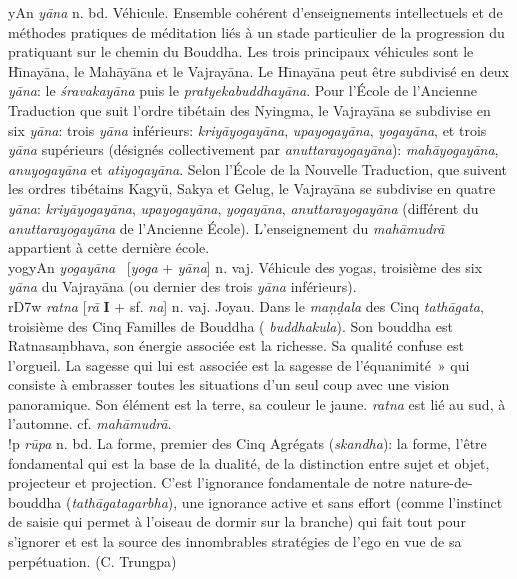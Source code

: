 \documentclass[a4paper,11pt,twocolumn]{article}
\begin{document}
{\dn yAn} {\em y\={a}na} n. bd. \og Véhicule\fg. Ensemble cohérent
d'enseignements intellectuels et de méthodes pratiques de méditation
liés à un stade particulier de la progression du pratiquant sur le
chemin du Bouddha. Les trois principaux véhicules sont le
H\={\i}nay\={a}na, le Mah\={a}y\={a}na et le
Vajray\={a}na. Le H\={\i}nay\={a}na peut être subdivisé en deux
{\em y\={a}na}: le {\em \'{s}ravakay\={a}na} puis le
{\em pratyekabuddhay\={a}na}. Pour l'École de l'Ancienne
Traduction que suit l'ordre tibétain des Nyingma, le
Vajray\={a}na se subdivise en six {\em y\={a}na}: trois {\em
y\={a}na} inférieurs: {\em kriy\={a}yogay\={a}na}, {\em
upayogay\={a}na},  {\em yogay\={a}na}, et trois {\em
y\={a}na} supérieurs (désignés collectivement par {\em
anuttarayogay\={a}na}): {\em mah\={a}yogay\={a}na}, {\em
anuyogay\={a}na} et {\em atiyogay\={a}na}. Selon l'École de
la Nouvelle Traduction, que suivent les ordres tibétains Kagyü,
Sakya et Gelug, le Vajray\={a}na se subdivise en quatre {\em
y\={a}na}: {\em kriy\={a}yogay\={a}na}, {\em upayogay\={a}na}, {\em
yogay\={a}na},  {\em anuttarayogay\={a}na} (différent du {\em
anuttarayogay\={a}na} de l'Ancienne École). L'enseignement du {\em
mah\={a}mudr\={a}} appartient à cette dernière école. \\


{\dn yogyAn} {\em yogay\={a}na} \ [{\em yoga} + {\em y\={a}na}]
n. vaj. \og Véhicule des yogas\fg, troisième des six {\em y\={a}na} du
Vajray\={a}na (ou dernier des trois {\em y\={a}na} inférieurs). \\

{\dn r\3D7w} {\em ratna} [{\em r\={a}} {\bf I} + sf. {\em na}]
n. vaj. \og Joyau\fg. Dans le {\em ma\d{n}\d{d}ala} des Cinq {\em
tath\={a}gata}, troisième des Cinq Familles de Bouddha ({\em
buddhakula}). Son bouddha est Ratnasa\d{m}bhava, son énergie associée
est la richesse. Sa qualité confuse est l'orgueil. La sagesse qui lui
est associée est \og la sagesse de l'équanimité~» qui consiste à
embrasser toutes les situations d'un seul coup avec une vision
panoramique. Son élément est la terre, sa couleur le jaune. {\em
ratna} est lié au sud, à l'automne. cf. {\em mah\={a}mudr\={a}}. \\

{\dn !p} {\em r\={u}pa} n. bd. \og La forme\fg, premier des Cinq
Agrégats  ({\em skandha}): la forme, l'être fondamental qui est la
base de la dualité, de la distinction entre sujet et objet, projecteur
et projection. C'est l'ignorance fondamentale de notre
nature-de-bouddha  ({\em tath\={a}gatagarbha}), une ignorance active
et sans effort (comme l'instinct de saisie qui permet à l'oiseau de
dormir sur la branche) qui fait tout pour s'ignorer et est la
source des innombrables stratégies de l'ego en vue de sa
perpétuation. (C. Trungpa) \\
\end{document}
